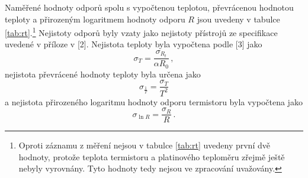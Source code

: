 \documentclass{../concepts/prepareprotokol} %
\begin{document}
Naměřené hodnoty odporů spolu s vypočtenou teplotou, převrácenou hodnotou teploty a přirozeným logaritmem hodnoty odporu $R$ jsou uvedeny v tabulce \ref{tab:rt}.\footnote{Oproti záznamu z měření nejsou v tabulce \ref{tab:rt} uvedeny první dvě hodnoty, protože teplota termistoru a platinového teploměru zřejmě ještě nebyly vyrovnány. Tyto hodnoty tedy nejsou ve zpracování uvažovány.} Nejistoty odporů byly vzaty jako nejistoty přístrojů ze specifikace uvedené v příloze v [2]. Nejistota teploty byla vypočtena podle [3] jako
\begin{equation}
    \sigma_T = \frac{\sigma_{R_t}}{\alpha R_0} \, ,
\end{equation}
nejistota převrácené hodnoty teploty byla určena jako
\begin{equation}
    \sigma_{\frac{1}{T}} = \frac{\sigma_T}{T^2}
\end{equation}
a nejistota přirozeného logaritmu hodnoty odporu termistoru byla vypočtena jako
\begin{equation}
    \sigma_{\ln{R}} = \frac{\sigma_{R}}{R} \, .
\end{equation}
\end{document}

